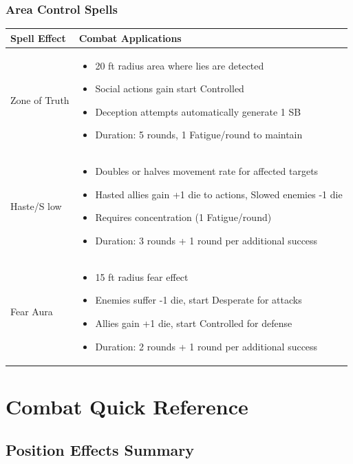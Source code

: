 \documentclass[11pt,letterpaper]{article}
\begin{document}
\subsubsection{Area Control Spells}

\begin{longtable}{|>{\raggedright\arraybackslash}p{4cm}|>{\raggedright\arraybackslash}p{8cm}|}
\hline
\textbf{Spell Effect} & \textbf{Combat Applications} \\
\hline
Zone of Truth & 
\begin{itemize}
    \item 20 ft radius area where lies are detected
    \item Social actions gain start Controlled
    \item Deception attempts automatically generate 1 SB
    \item Duration: 5 rounds, 1 Fatigue/round to maintain
\end{itemize} \\
\hline
Haste/S low & 
\begin{itemize}
    \item Doubles or halves movement rate for affected targets
    \item Hasted allies gain +1 die to actions, Slowed enemies -1 die
    \item Requires concentration (1 Fatigue/round)
    \item Duration: 3 rounds + 1 round per additional success
\end{itemize} \\
\hline
Fear Aura & 
\begin{itemize}
    \item 15 ft radius fear effect
    \item Enemies suffer -1 die, start Desperate for attacks
    \item Allies gain +1 die, start Controlled for defense
    \item Duration: 2 rounds + 1 round per additional success
\end{itemize} \\
\hline
\end{longtable}

\newpage

\section{Combat Quick Reference}

\subsection{Position Effects Summary}
\end{document}
